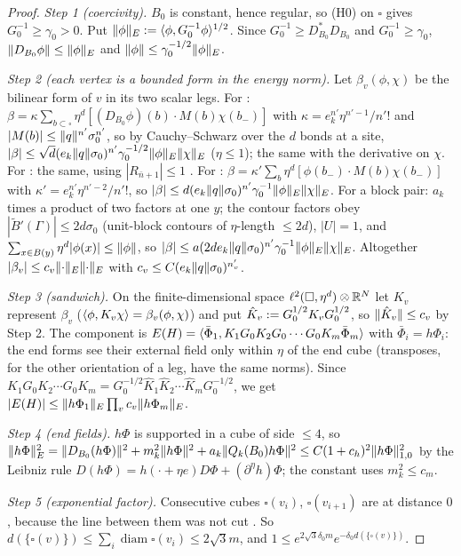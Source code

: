 \begin{proof}
\emph{Step 1 (coercivity).} $B_0$ is constant, hence regular, so (H0) on $\square$ gives $G_0^{-1}\ge\gamma_0>0$. Put $\lVert \phi\rVert_E:=\langle \phi,G_0^{-1}\phi\rangle^{1/2}$. Since $G_0^{-1}\ge D_{B_0}^*D_{B_0}$ and $G_0^{-1}\ge\gamma_0$, $\lVert D_{B_0}\phi\rVert\le\lVert \phi\rVert_E$ and $\lVert \phi\rVert\le\gamma_0^{-1/2}\lVert \phi\rVert_E$.

\emph{Step 2 (each vertex is a bounded form in the energy norm).} Let $\beta_v(\phi,\chi)$ be the bilinear form of $v$ in its two scalar legs. For \cite[(1.8)]{Ba3}: $\beta=\kappa\sum_{b\subset\square}\eta^d[(D_{B_0}\phi)(b)\cdot M(b)\chi(b_-)]$ with $\kappa=e_k^{n'}\eta^{n'-1}/n'!$ and $|M(b)|\le\lVert q\rVert^{n'}\sigma_0^{n'}$, so by Cauchy--Schwarz over the $d$ bonds at a site, $|\beta|\le\sqrt d(e_k\lVert q\rVert\sigma_0)^{n'}\gamma_0^{-1/2}\lVert \phi\rVert_E\lVert \chi\rVert_E$ ($\eta\le1$); the same with the derivative on $\chi$. For \cite[(1.9), (1.11)]{Ba3}: the same, using $|R_{\bar n+1}|\le1$ \cite[p.~414]{Ba3}. For \cite[(1.10)]{Ba3}: $\beta=\kappa'\sum_b\eta^d[\phi(b_-)\cdot M(b)\chi(b_-)]$ with $\kappa'=e_k^{n'}\eta^{n'-2}/n'!$, so $|\beta|\le d(e_k\lVert q\rVert\sigma_0)^{n'}\gamma_0^{-1}\lVert \phi\rVert_E\lVert \chi\rVert_E$. For a block pair: $a_k$ times a product of two factors \cite[(1.13)--(1.14)]{Ba3} at one $y$; the contour factors obey $|\tilde B'(\Gamma)|\le2d\sigma_0$ (unit-block contours of $\eta$-length $\le2d$), $|U|=1$, and $\sum_{x\in B(y)}\eta^d|\phi(x)|\le\lVert \phi\rVert$, so $|\beta|\le a(2de_k\lVert q\rVert\sigma_0)^{n'}\gamma_0^{-1}\lVert \phi\rVert_E\lVert \chi\rVert_E$. Altogether $|\beta_v|\le c_v\lVert \cdot\rVert_E\lVert \cdot\rVert_E$ with $c_v\le C(e_k\lVert q\rVert\sigma_0)^{n'_v}$.

\emph{Step 3 (sandwich).} On the finite-dimensional space $\ell^2(\square,\eta^d)\otimes\mathbb R^N$ let $K_v$ represent $\beta_v$ ($\langle \phi,K_v\chi\rangle=\beta_v(\phi,\chi)$) and put $\hat K_v:= G_0^{1/2}K_vG_0^{1/2}$, so $\lVert \hat K_v\rVert\le c_v$ by Step 2. The component is $E(H)=\langle \bar\Phi_1,K_1G_0K_2G_0\cdots G_0K_m\bar\Phi_m\rangle$ with $\bar\Phi_i=h\Phi_i$: the end forms see their external field only within $\eta$ of the end cube (transposes, for the other orientation of a leg, have the same norms). Since $K_1G_0K_2\cdots G_0K_m=G_0^{-1/2}\hat K_1\hat K_2\cdots\hat K_mG_0^{-1/2}$, we get $|E(H)|\le\lVert h\Phi_1\rVert_E\prod_vc_v\lVert h\Phi_m\rVert_E$.

\emph{Step 4 (end fields).} $h\Phi$ is supported in a cube of side $\le4$, so $\lVert h\Phi\rVert_E^2=\lVert D_{B_0}(h\Phi)\rVert^2+m_k^2\lVert h\Phi\rVert^2+a_k\lVert Q_k(B_0)h\Phi\rVert^2\le C(1+c_h)^2\lVert h\Phi\rVert_{1,0}^2$ by the Leibniz rule $D(h\Phi)=h(\cdot+\eta e)D\Phi+(\partial^\eta h)\Phi$; the constant uses $m_k^2\le c_m$.

\emph{Step 5 (exponential factor).} Consecutive cubes $\square(v_i)$, $\square(v_{i+1})$ are at distance $0$, because the line between them was not cut \cite[pp.~432--433]{Ba3}. So $d(\{\square(v)\})\le\sum_i\operatorname{diam}\square(v_i)\le2\sqrt3m$, and $1\le e^{2\sqrt3\delta_0m}e^{-\delta_0d(\{\square(v)\})}$.
\end{proof}

